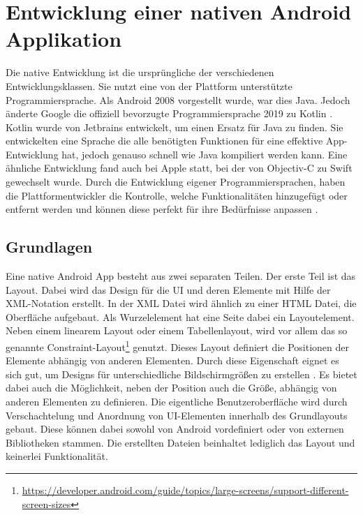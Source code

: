 \section{Entwicklung einer nativen Android Applikation}
Die native Entwicklung ist die ursprüngliche der verschiedenen Entwicklungsklassen. Sie nutzt eine von der Plattform unterstützte Programmiersprache. Als Android 2008 vorgestellt wurde, war dies Java.
Jedoch änderte Google die offiziell bevorzugte Programmiersprache 2019 zu Kotlin \cite{android_standard}. 
Kotlin wurde von Jetbrains entwickelt, um einen Ersatz für Java zu finden. 
Sie entwickelten eine Sprache die alle benötigten Funktionen für eine effektive App-Entwicklung hat, jedoch genauso schnell wie Java kompiliert werden kann\cite{medium_Swift_Kotlin}. 
Eine ähnliche Entwicklung fand auch bei Apple statt, bei der von Objectiv-C zu Swift gewechselt wurde. 
Durch die Entwicklung eigener Programmiersprachen, haben die Plattformentwickler die Kontrolle, welche Funktionalitäten hinzugefügt oder entfernt werden und können diese perfekt für ihre Bedürfnisse anpassen \cite{medium_Swift_Kotlin}.

\subsection{Grundlagen}
Eine native Android App besteht aus zwei separaten Teilen.
Der erste Teil ist das Layout. Dabei wird das Design für die UI und deren Elemente mit Hilfe der XML-Notation erstellt.
In der XML Datei wird ähnlich zu einer HTML Datei, die Oberfläche aufgebaut. Als Wurzelelement hat eine Seite dabei ein Layoutelement. Neben einem linearem Layout oder einem Tabellenlayout, wird vor allem das so genannte Constraint-Layout\footnote{\url{https://developer.android.com/guide/topics/large-screens/support-different-screen-sizes}} genutzt. 
Dieses Layout definiert die Positionen der Elemente abhängig von anderen Elementen. Durch diese Eigenschaft eignet es sich gut, um Designs für unterschiedliche Bildschirmgrößen zu erstellen \cite{ConstraintLayout_Android}. Es bietet dabei auch die Möglichkeit, neben der Position auch die Größe, abhängig von anderen Elementen zu definieren.
Die eigentliche Benutzeroberfläche wird durch Verschachtelung und Anordnung von UI-Elementen innerhalb des Grundlayouts gebaut. Diese können dabei sowohl von Android vordefiniert oder von externen Bibliotheken stammen. Die erstellten Dateien beinhaltet lediglich das Layout und keinerlei Funktionalität.

